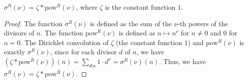 \begin{theorem}
\label{sigmaR_eq_zeta_mul_powR}
\leanok
$\sigma^R(\nu) = \zeta * \text{pow}^R(\nu)$, where $\zeta$ is the constant function $1$.
\end{theorem}
\begin{proof}
\leanok
The function $\sigma^R(\nu)$ is defined as the sum of the $\nu$-th powers of the divisors of $n$. The function $\text{pow}^R(\nu)$ is defined as $n \mapsto n^\nu$ for $n \neq 0$ and $0$ for $n = 0$. The Dirichlet convolution of $\zeta$ (the constant function $1$) and $\text{pow}^R(\nu)$ is exactly $\sigma^R(\nu)$, since for each divisor $d$ of $n$, we have $(\zeta * \text{pow}^R(\nu))(n) = \sum_{d|n} 1 \cdot d^\nu = \sigma^R(\nu)(n)$. Thus, we have $\sigma^R(\nu) = \zeta * \text{pow}^R(\nu)$.
\end{proof}
